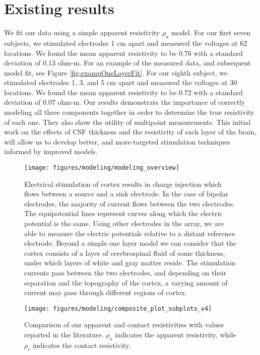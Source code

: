 \section{Existing results}
We fit our data using a simple apparent resistivity $ \rho_a $ model. For our first seven subjects, we stimulated electrodes 1 cm apart and measured the voltages at 62 locations. We found the mean apparent resistivity to be 0.76 with a standard deviation of 0.13 ohm-m. For an example of the measured data, and subsequent model fit, see Figure \ref{fig:exampOneLayerFit}. For our eighth subject, we stimulated electrodes 1, 3, and 5 cm apart and measured the voltages at 30 locations. We found the mean apparent resistivity to be 0.72 with a standard deviation of 0.07 ohm-m. Our results demonstrate the importance of correctly modeling all three components together in order to determine the true resistivity of each one. They also show the utility of multipoint measurements. This initial work on the effects of CSF thickness and the resistivity of each layer of the brain, will allow us to develop better, and more-targeted stimulation techniques informed by improved models.

\begin{figure}[ht]
	\centering
	\texttt{[image: figures/modeling/modeling\_overview]}
	\caption[What is the resistance of the human brain?]{Electrical stimulation of cortex results in charge injection which flows between a source and a sink electrode. In the case of bipolar electrodes, the majority of current flows between the two electrodes. The equipotential lines represent curves along which the electric potential is the same. Using other electrodes in the array, we are able to measure the electric potentials relative to a distant reference electrode.  Beyond a simple one layer model we can consider that the cortex consists of a layer of cerebrospinal fluid of some thickness, under which layers of white and gray matter reside. The stimulation currents pass between the two electrodes, and depending on their separation and the topography of the cortex, a varying amount of current may pass through different regions of cortex. }
	\label{fig:modelingOverview}
\end{figure}


\begin{figure}[ht]
	\centering
	\texttt{[image: figures/modeling/composite\_plot\_subplots\_v4]}
	\caption[Calculated apparent and contact resistivites and the literature]{Comparison of our apparent and contact resistivities with values reported in the literature. $ \rho_a $ indicates the apparent resistivity, while $ \rho_c $ indicates the contact resistivity. }
	\label{fig:apparentResist}
\end{figure}

